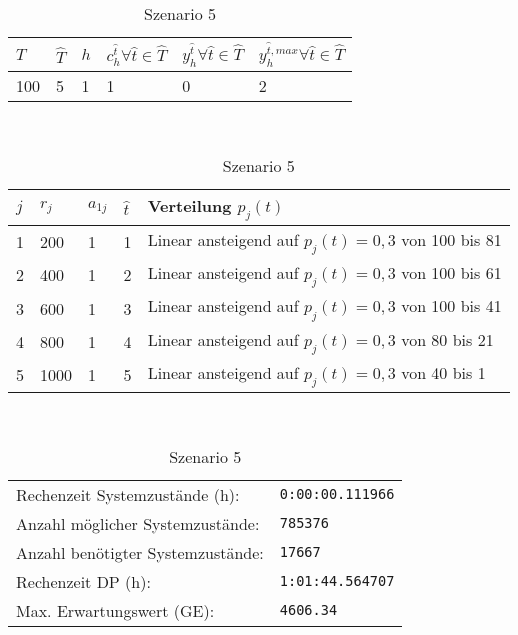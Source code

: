 \begin{table}[h!]
\renewcommand{\arraystretch}{1.5}
  \begin{center}
    \caption{Szenario 5}  \label{S5}
    \vspace*{3mm}
    \begin{tabular}{l l l l l l}   %
    $T$ & $\hat T$  & $h$ & $c_h^{\hat t}\forall \hat{t}\in{\hat T}$ & $y_h^{\hat t}\forall \hat{t}\in{\hat T}$  & $y_h^{{\hat t},max}\forall \hat{t}\in{\hat T}$  \\  \hline
100 & 5 & 1 & 1 & 0 & 2  \\ \hline
    \end{tabular} \\[3mm]
        \begin{tabular}{p{.5cm} p{.5cm} p{.5cm}  p{.5cm} p{9cm}}   %
    $j$ & $r_j$  & $a_{1j}$ & $\hat t$ & Verteilung $p_j(t)$ \\  \hline
1 & 200 & 1 & 1 & Linear ansteigend auf $p_j(t)=0,3$ von 100 bis 81   \\
2 & 400 & 1 & 2 & Linear ansteigend auf $p_j(t)=0,3$ von 100 bis 61  \\
3 & 600 & 1 & 3 & Linear ansteigend auf $p_j(t)=0,3$ von 100 bis 41  \\
4 & 800 & 1 & 4 & Linear ansteigend auf $p_j(t)=0,3$ von 80 bis 21  \\
5 & 1000 & 1 & 5 & Linear ansteigend auf $p_j(t)=0,3$ von 40 bis 1 \\
\hline
    \end{tabular} \\[3mm]
     \begin{tabular}{p{7cm}p{5cm}} \hline
     Rechenzeit Systemzustände (h): & \texttt{0:00:00.111966} \\
     Anzahl möglicher Systemzustände: & \texttt{785376} \\
     Anzahl benötigter Systemzustände: & \texttt{17667} \\ 
     Rechenzeit DP (h): & \texttt{1:01:44.564707} \\ 
          Max. Erwartungswert (GE): & \texttt{4606.34} \\ \hline
         \end{tabular} \\[3mm]
  \end{center}
\end{table}

